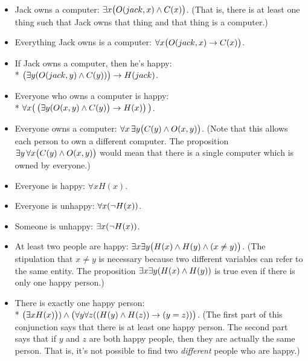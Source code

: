 \begin{itemize}
\setlength{\itemsep}{0pt plus 1 pt}
\setlength{\parsep}{0pt plus 1 pt}
\item Jack owns a computer: $\exists x\big(O(jack,x)\wedge C(x)\big)$.
(That is, there is at least one thing such that Jack owns that thing and that thing
is a computer.)
\item Everything Jack owns is a computer: $\forall x\big(O(jack,x)\rightarrow C(x)\big)$.
\item If Jack owns a computer, then he's happy:\\*
\hspace*{0.5in}$\big(\exists y(O(jack,y)\wedge C(y))\big)\rightarrow H(jack)$.
\item Everyone who owns a computer is happy:\\*
\hspace*{0.5in} $\forall x\big(\,\big(\exists y(O(x,y)\wedge C(y)\big)\rightarrow H(x)\big)\,\big)$.
\item Everyone owns a computer: $\forall x\,\exists y\big(C(y)\wedge O(x,y)\big)$.
(Note that this allows each person to own a different computer.
The proposition $\exists y\,\forall x\big(C(y)\wedge O(x,y)\big)$
would mean that there is a single computer which is owned by
everyone.)
\item Everyone is happy: $\forall xH(x)$.
\item Everyone is unhappy: $\forall x(\lnot H(x))$.
\item Someone is unhappy: $\exists x(\lnot H(x))$.
\item At least two people are happy:
 $\exists x \exists y\big(H(x) \wedge H(y) \wedge (x\ne y)\big)$.  (The stipulation
 that $x\ne y$ is necessary because two different variables can refer to
 the same entity.  The proposition $\exists x\exists y(H(x)\wedge H(y))$ is
 true even if there is only one happy person.)
\item There is exactly one happy person:\\*
 \hspace*{0.5 in}$\big(\exists x H(x)\big)) \wedge \big(\forall y \forall z((H(y)\wedge H(z))\rightarrow (y=z))\big)$.
 (The first part of this conjunction says that there is at least one happy person.
 The second part says that if $y$ and $z$ are both happy people, then they are actually
 the same person. That is, it's not possible to find two \emph{different} people who
 are happy.)
\end{itemize}

\medskip


